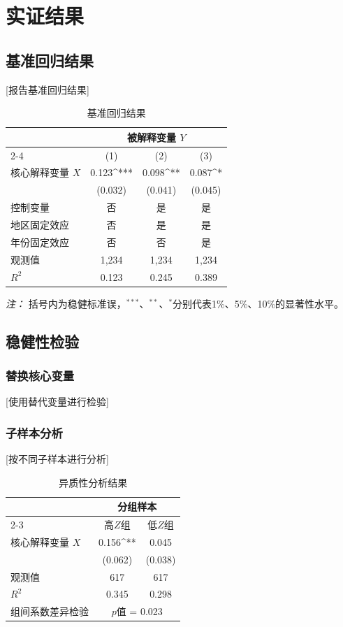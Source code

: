 \documentclass[UTF8, a4paper, 12pt]{ctexart}
\numberwithin{equation}{section}
\begin{document}
\section{实证结果}

\subsection{基准回归结果}
[报告基准回归结果]

\begin{table}[H]
\caption{基准回归结果}
\label{tab:baseline}
\centering
\begin{tabular}{lccc}
\toprule
 & \multicolumn{3}{c}{被解释变量 $Y$} \\
\cmidrule(lr){2-4}
 & (1) & (2) & (3) \\
\midrule
核心解释变量 $X$ & 0.123^{***} & 0.098^{**} & 0.087^{*} \\
 & (0.032) & (0.041) & (0.045) \\
\midrule
控制变量 & 否 & 是 & 是 \\
地区固定效应 & 否 & 是 & 是 \\
年份固定效应 & 否 & 否 & 是 \\
\midrule
观测值 & 1,234 & 1,234 & 1,234 \\
$R^2$ & 0.123 & 0.245 & 0.389 \\
\bottomrule
\end{tabular}
\begin{minipage}{\linewidth}
\smallskip
\textit{注：} 括号内为稳健标准误，$^{***}$、$^{**}$、$^{*}$分别代表1\%、5\%、10\%的显著性水平。
\end{minipage}
\end{table}

\subsection{稳健性检验}

\subsubsection{替换核心变量}
[使用替代变量进行检验]

\subsubsection{子样本分析}
[按不同子样本进行分析]

\begin{table}[H]
\caption{异质性分析结果}
\label{tab:heterogeneity}
\centering
\begin{tabular}{lcc}
\toprule
 & \multicolumn{2}{c}{分组样本} \\
\cmidrule(lr){2-3}
 & 高$Z$组 & 低$Z$组 \\
\midrule
核心解释变量 $X$ & 0.156^{**} & 0.045 \\
 & (0.062) & (0.038) \\
\midrule
观测值 & 617 & 617 \\
$R^2$ & 0.345 & 0.298 \\
\midrule
组间系数差异检验 & \multicolumn{2}{c}{$p$值 = 0.023} \\
\bottomrule
\end{tabular}
\end{table}
\end{document}
